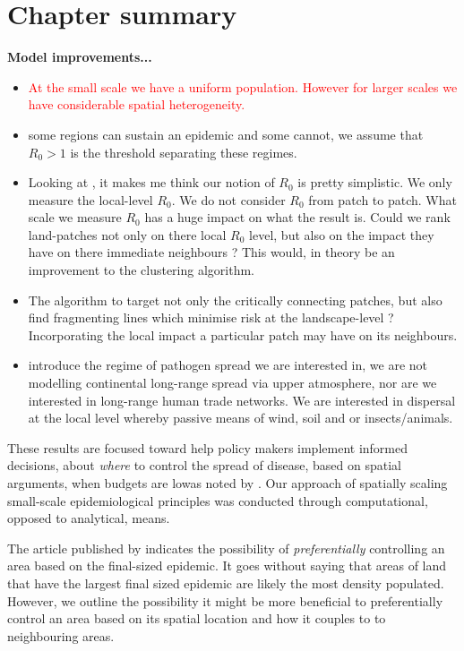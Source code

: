 \section{Chapter summary}

\textbf{Model improvements...}
\begin{itemize}
    \item \textcolor{red}{At the small scale we have a uniform population. However for larger scales we have considerable spatial heterogeneity.}
    \item some regions can sustain an epidemic and some cannot, we assume that $R_0>1$ is the threshold separating these regimes.
    \item Looking at \cite{R0-perc-ref}, it makes me think our notion of $R_0$ is pretty simplistic. We only measure the local-level $R_0$. We do not consider $R_0$ from patch to patch. What scale we measure $R_0$ has a huge impact on what the result is. Could we rank land-patches not only on there local $R_0$ level, but also on the impact they have on there immediate neighbours ? This would, in theory be an improvement to the clustering algorithm.
    \item The algorithm to target not only the critically connecting patches, but also find fragmenting lines which minimise risk at the landscape-level ? Incorporating the local impact a particular patch may have on its neighbours.
    \item introduce the regime of pathogen spread we are interested in, we are not modelling continental long-range spread via upper atmosphere, nor are we interested in long-range human trade networks. We are interested in dispersal at the local level whereby passive means of wind, soil and or insects/animals. 
\end{itemize}

These results are focused toward help policy makers implement informed decisions, about \textit{where} to control the spread of disease, based on spatial arguments, when budgets are low\textemdash as noted by \cite{time-varying-infectivity}. Our approach of spatially scaling small-scale epidemiological principles was conducted through computational, opposed to analytical, means. 

The article published by \cite{time-varying-infectivity} indicates the possibility of \textit{preferentially} controlling an area based on the final-sized epidemic. It goes without saying that areas of land that have the largest final sized epidemic are likely the most density populated. However, we outline the possibility it might be more beneficial to preferentially control an area based on its spatial location and how it couples to to neighbouring areas.

